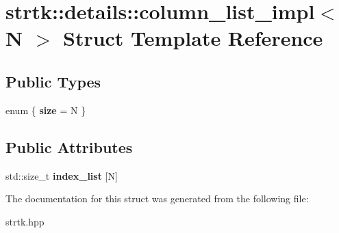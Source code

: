\hypertarget{structstrtk_1_1details_1_1column__list__impl}{\section{strtk\-:\-:details\-:\-:column\-\_\-list\-\_\-impl$<$ N $>$ Struct Template Reference}
\label{structstrtk_1_1details_1_1column__list__impl}
}
\subsection*{Public Types}
\begin{DoxyCompactItemize}
\item 
enum \{ {\bfseries size} = N
 \}
\end{DoxyCompactItemize}
\subsection*{Public Attributes}
\begin{DoxyCompactItemize}
\item 
\hypertarget{structstrtk_1_1details_1_1column__list__impl_a5bd60e41322f532f02ec28258489419f}{std\-::size\-\_\-t {\bfseries index\-\_\-list} \mbox{[}N\mbox{]}}\label{structstrtk_1_1details_1_1column__list__impl_a5bd60e41322f532f02ec28258489419f}

\end{DoxyCompactItemize}


The documentation for this struct was generated from the following file\-:\begin{DoxyCompactItemize}
\item 
strtk.\-hpp\end{DoxyCompactItemize}
